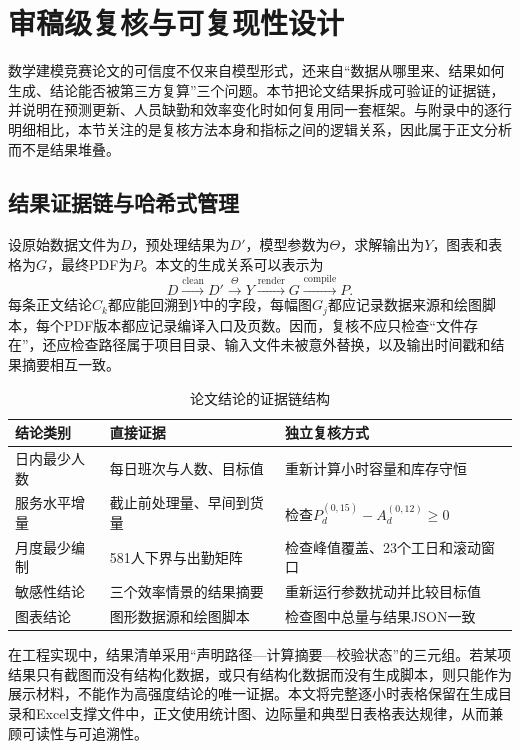 \section{审稿级复核与可复现性设计}

数学建模竞赛论文的可信度不仅来自模型形式，还来自“数据从哪里来、结果如何生成、结论能否被第三方复算”三个问题。本节把论文结果拆成可验证的证据链，并说明在预测更新、人员缺勤和效率变化时如何复用同一套框架。与附录中的逐行明细相比，本节关注的是复核方法本身和指标之间的逻辑关系，因此属于正文分析而不是结果堆叠。

\subsection{结果证据链与哈希式管理}

设原始数据文件为$D$，预处理结果为$D'$，模型参数为$\Theta$，求解输出为$Y$，图表和表格为$G$，最终PDF为$P$。本文的生成关系可以表示为
\begin{equation}
 D\xrightarrow{\mathrm{clean}}D'\xrightarrow{\Theta}Y
 \xrightarrow{\mathrm{render}}G\xrightarrow{\mathrm{compile}}P.
\end{equation}
每条正文结论$C_k$都应能回溯到$Y$中的字段，每幅图$G_j$都应记录数据来源和绘图脚本，每个PDF版本都应记录编译入口及页数。因而，复核不应只检查“文件存在”，还应检查路径属于项目目录、输入文件未被意外替换，以及输出时间戳和结果摘要相互一致。

\begin{table}[htbp]
\centering
\caption{论文结论的证据链结构}
\label{tab:evidence-chain}
\begin{tabular}{p{}p{}p{}}
\toprule
结论类别 & 直接证据 & 独立复核方式\\
\midrule
日内最少人数 & 每日班次与人数、目标值 & 重新计算小时容量和库存守恒\\
服务水平增量 & 截止前处理量、早间到货量 & 检查$P_d^{(0,15)}-A_d^{(0,12)}\ge0$\\
月度最少编制 & 581人下界与出勤矩阵 & 检查峰值覆盖、23个工日和滚动窗口\\
敏感性结论 & 三个效率情景的结果摘要 & 重新运行参数扰动并比较目标值\\
图表结论 & 图形数据源和绘图脚本 & 检查图中总量与结果JSON一致\\
\bottomrule
\end{tabular}
\end{table}

在工程实现中，结果清单采用“声明路径—计算摘要—校验状态”的三元组。若某项结果只有截图而没有结构化数据，或只有结构化数据而没有生成脚本，则只能作为展示材料，不能作为高强度结论的唯一证据。本文将完整逐小时表格保留在生成目录和Excel支撑文件中，正文使用统计图、边际量和典型日表格表达规律，从而兼顾可读性与可追溯性。

